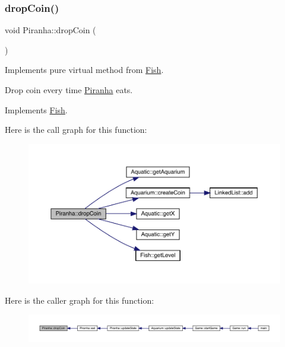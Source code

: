 \subsubsection{\texorpdfstring{drop\+Coin()}{dropCoin()}}
{\footnotesize\ttfamily void Piranha\+::drop\+Coin (\begin{DoxyParamCaption}{ }\end{DoxyParamCaption})\hspace{0.3cm}{\ttfamily [virtual]}}



Implements pure virtual method from \mbox{\hyperlink{class_fish}{Fish}}. 

Drop coin every time \mbox{\hyperlink{class_piranha}{Piranha}} eats. 

Implements \mbox{\hyperlink{class_fish_a899c7712639756297b9205e8bbcc2cf6}{Fish}}.

Here is the call graph for this function\+:\nopagebreak
\begin{figure}[H]
\begin{center}
\leavevmode
\includegraphics[width=350pt]{class_piranha_aee107987f36631002f04c5283564382b_cgraph}
\end{center}
\end{figure}
Here is the caller graph for this function\+:\nopagebreak
\begin{figure}[H]
\begin{center}
\leavevmode
\includegraphics[width=350pt]{class_piranha_aee107987f36631002f04c5283564382b_icgraph}
\end{center}
\end{figure}
\mbox{\label{class_piranha_ac48c0256edd56c427b3d82f6e0d4df82}} 
